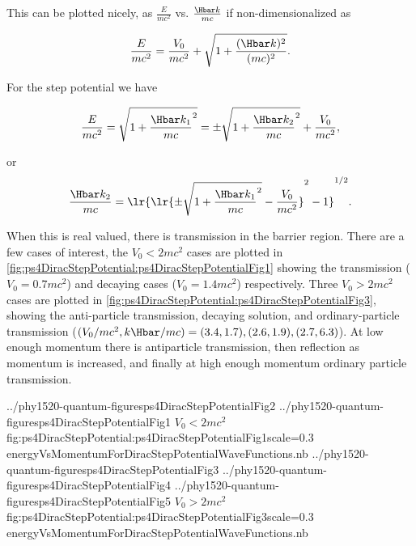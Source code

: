 This can be plotted nicely, as \( \frac{E}{m c^2} \) vs. \( \frac{\Hbar k}{m c} \) if non-dimensionalized as

\begin{dmath}\label{eqn:gradQuantumProblemSet4Problem3:580}
\frac{E}{m c^2} = \frac{V_0}{m c^2} + \sqrt{1 + \frac{(\Hbar k)^2}{(m c)^2} }.
\end{dmath}

For the step potential we have

\begin{dmath}\label{eqn:gradQuantumProblemSet4Problem3:600}
\frac{E}{m c^2}
= \sqrt{ 1 + {\frac{ \Hbar k_1}{m c} }^2 }
= \pm \sqrt{ 1 + {\frac{ \Hbar k_2}{m c} }^2 } + \frac{V_0}{m c^2},
\end{dmath}

or
\begin{dmath}\label{eqn:gradQuantumProblemSet4Problem3:620}
\frac{ \Hbar k_2}{m c}
=
\lr{ \lr{ \pm \sqrt{ 1 + {\frac{ \Hbar k_1}{m c} }^2 } - \frac{V_0}{m c^2} }^2 - 1 }^{1/2}.
\end{dmath}

When this is real valued, there is transmission in the barrier region.  There are a few cases of interest, the \( V_0 < 2 m c^2 \) cases are plotted in \cref{fig:ps4DiracStepPotential:ps4DiracStepPotentialFig1} showing the transmission (\( V_0 = 0.7 m c^2 \)) and decaying cases (\( V_0 = 1.4 m c^2 \)) respectively.
Three \( V_0 > 2 m c^2 \) cases are plotted in \cref{fig:ps4DiracStepPotential:ps4DiracStepPotentialFig3},
showing the
anti-particle transmission,
decaying solution,
and ordinary-particle transmission
(\( (V_0/m c^2,k \Hbar/m c) = (3.4,1.7), (2.6,1.9), (2.7,6.3) \)).  At low enough momentum there is antiparticle transmission, then reflection as momentum is increased, and finally at high enough momentum ordinary particle transmission.

\mathImageTwoFigures
{../phy1520-quantum-figuresps4DiracStepPotentialFig2}
{../phy1520-quantum-figuresps4DiracStepPotentialFig1}
{\( V_0 < 2 m c^2 \)}{fig:ps4DiracStepPotential:ps4DiracStepPotentialFig1}{scale=0.3}
{energyVsMomentumForDiracStepPotentialWaveFunctions.nb}
\mathImageThreeFiguresOneLine
{../phy1520-quantum-figuresps4DiracStepPotentialFig3}
{../phy1520-quantum-figuresps4DiracStepPotentialFig4}
{../phy1520-quantum-figuresps4DiracStepPotentialFig5}
{\( V_0 > 2 m c^2 \)}{fig:ps4DiracStepPotential:ps4DiracStepPotentialFig3}{scale=0.3}
{energyVsMomentumForDiracStepPotentialWaveFunctions.nb}

